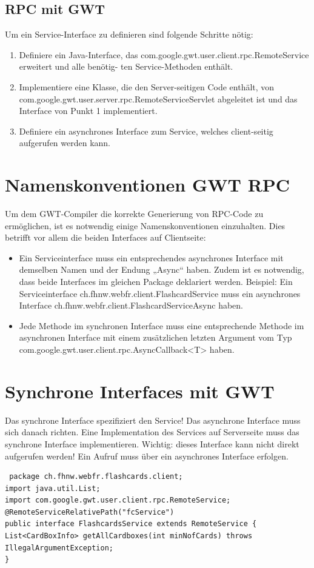 \documentclass[a4paper,10pt]{scrreprt}
\begin{document}
\subsection{RPC mit GWT}

Um ein Service-Interface zu definieren sind folgende Schritte nötig:
\begin{enumerate}
\item Definiere ein Java-Interface, das
com.google.gwt.user.client.rpc.RemoteService erweitert und alle benötig-
ten Service-Methoden enthält.
\item Implementiere eine Klasse, die den Server-seitigen Code enthält, von
com.google.gwt.user.server.rpc.RemoteServiceServlet abgeleitet ist und
das Interface von Punkt 1 implementiert.
\item Definiere ein asynchrones Interface zum Service, welches client-seitig aufgerufen werden
kann.
\end{enumerate}

\section{Namenskonventionen GWT RPC}
Um dem GWT-Compiler die korrekte Generierung von RPC-Code zu ermöglichen, ist es notwendig
einige Namenskonventionen einzuhalten. Dies betrifft vor allem die beiden Interfaces auf Clientseite:
\begin{itemize}
\item Ein Serviceinterface muss ein entsprechendes asynchrones Interface mit demselben Namen
und der Endung „Async“ haben. Zudem ist es notwendig, dass beide Interfaces im gleichen
Package deklariert werden. Beispiel: Ein Serviceinterface
ch.fhnw.webfr.client.FlashcardService muss ein asynchrones Interface
ch.fhnw.webfr.client.FlashcardServiceAsync haben.
\item Jede Methode im synchronen Interface muss eine entsprechende Methode im asynchronen
Interface mit einem zusätzlichen letzten Argument vom Typ
com.google.gwt.user.client.rpc.AsyncCallback<T> haben.
\end{itemize}

\section{Synchrone Interfaces mit GWT}
\begin{framed}
Das synchrone Interface spezifiziert den Service! Das asynchrone Interface muss sich danach richten.
Eine Implementation des Services auf Serverseite muss das synchrone Interface implementieren.
Wichtig: dieses Interface kann nicht direkt aufgerufen werden! Ein Aufruf muss über ein asynchrones
Interface erfolgen.
\end{framed}
\begin{lstlisting}
 package ch.fhnw.webfr.flashcards.client;
import java.util.List;
import com.google.gwt.user.client.rpc.RemoteService;
@RemoteServiceRelativePath("fcService")
public interface FlashcardsService extends RemoteService {
List<CardBoxInfo> getAllCardboxes(int minNofCards) throws IllegalArgumentException;
}
\end{lstlisting}
\end{document}

